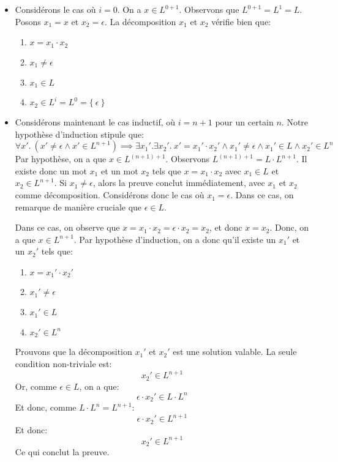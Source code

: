 \documentclass[12pt,french,a4paper]{article}
\begin{document}
\begin{itemize}
\item Considérons le cas où $i = 0$. On a $x \in L^{0+1}$. Observons que $L^{0+1} = L^1 = L$. Posons $x_1 = x$ et $x_2 = \epsilon$. La décomposition $x_1$ et $x_2$ vérifie bien que: 
\begin{enumerate}
\item $x = x_1 \cdot x_2$
\item $x_1 \neq \epsilon$
\item $x_1 \in L$
\item $x_2 \in L^i = L^0 = \{\ \epsilon\ \}$
\end{enumerate}

\item Considérons maintenant le cas inductif, où $i = n + 1$ pour un certain $n$. Notre hypothèse d'induction stipule que:
\[
\forall x'.\ (x' \neq \epsilon \wedge x' \in L^{n+1}) \implies \exists x_1'. \exists x_2'.\ x' = x_1' \cdot x_2' \wedge x_1' \neq \epsilon \wedge x_1' \in L \wedge x_2' \in L^n
\]
Par hypothèse, on a que $x \in L^{(n + 1) + 1}$. Observons $L^{(n + 1) + 1} = L \cdot L^{n + 1}$.
Il existe donc un mot $x_1$ et un mot $x_2$ tels que $x = x_1 \cdot x_2$ avec $x_1 \in L$ et $x_2 \in L^{n + 1}$.
Si $x_1 \neq \epsilon$, alors la preuve conclut immédiatement, avec $x_1$ et $x_2$ comme décomposition.
Considérons donc le cas où $x_1 = \epsilon$. Dans ce cas, on remarque de manière cruciale que $\epsilon \in L$.

Dans ce cas, on observe que $x = x_1 \cdot x_2 = \epsilon \cdot x_2 = x_2$, et donc $x = x_2$. Donc, on a que $x \in L^{n + 1}$.
Par hypothèse d'induction, on a donc qu'il existe un $x_1'$ et un $x_2'$ tels que:
\begin{enumerate}
\item $x = x_1' \cdot x_2'$
\item $x_1' \neq \epsilon$
\item $x_1' \in L$
\item $x_2' \in L^n$
\end{enumerate}
Prouvons que la décomposition $x_1'$ et $x_2'$ est une solution valable.
La seule condition non-triviale est:
\[
x_2' \in L^{n + 1}
\]
Or, comme $\epsilon \in L$, on a que:
\[
\epsilon \cdot x_2' \in L \cdot L^n
\]
Et donc, comme $L \cdot L^n = L^{n + 1}$: 
\[
\epsilon \cdot x_2' \in L^{n + 1}
\]
Et donc:
\[
x_2' \in L^{n + 1}
\]
Ce qui conclut la preuve.
\end{itemize}

\end{document}
